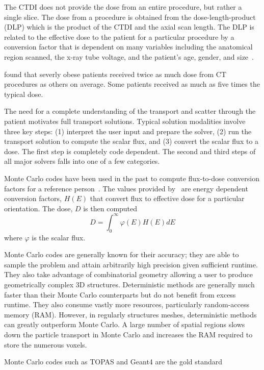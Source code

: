 The CTDI does not provide the dose from an entire procedure, but rather a single slice. The dose from a procedure is obtained from the dose-length-product (DLP) which is the product of the CTDI and the axial scan length. The DLP is related to the effective dose to the patient for a particular procedure by a conversion factor that is dependent on many variables including the anatomical region scanned, the x-ray tube voltage, and the patient's age, gender, and size~\citep{ref:hudaw}.

\citet{ref:lauk} found that severly obese patients received twice as much dose from CT procedures as others on average. Some patients received as much as five times the typical dose.

The need for a complete understanding of the transport and scatter through the patient motivates full transport solutions. Typical solution modalities involve three key steps: (1) interpret the user input and prepare the solver, (2) run the transport solution to compute the scalar flux, and (3) convert the scalar flux to a dose. The first step is completely code dependent. The second and third steps of all major solvers falls into one of a few categories.

Monte Carlo codes have been used in the past to compute flux-to-dose conversion factors for a reference person~\citep{ref:icrp116}. The values provided by~\citet{ref:icrp116} are energy dependent conversion factors, $H(E)$ that convert flux to effective dose for a particular orientation. The dose, $D$ is then computed
\begin{equation}
D = \int_0^\infty \varphi(E) H(E) dE
\end{equation}
where $\varphi$ is the scalar flux.

Monte Carlo codes are generally known for their accuracy; they are able to sample the problem and attain arbitrarily high precision given sufficient runtime. They also take advantage of combinatorial geometry allowing a user to produce geometrically complex 3D structures. Deterministic methods are generally much faster than their Monte Carlo counterparts but do not benefit from excess runtime. They also consume vastly more resources, particularly random-access memory (RAM). However, in regularly structures meshes, deterministic methods can greatly outperform Monte Carlo. A large number of spatial regions slows down the particle transport in Monte Carlo and increases the RAM required to store the numerous voxels.

Monte Carlo codes such as TOPAS and Geant4 \citep{ref:agostinellis} are the gold standard \citep{ref:jiax}

